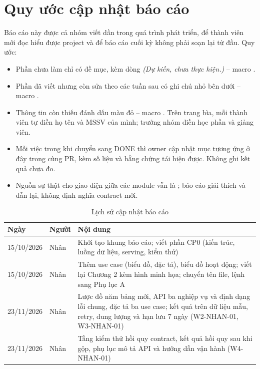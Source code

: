 \chapter*{Quy ước cập nhật báo cáo}
Báo cáo này được cả nhóm viết dần trong quá trình phát triển, để thành viên mới đọc hiểu được project và để báo cáo
cuối kỳ không phải soạn lại từ đầu. Quy ước:
\begin{itemize}
  \item Phần chưa làm chỉ có đề mục, kèm dòng \textit{(Dự kiến, chưa thực hiện.)} -- macro .
  \item Phần đã viết nhưng còn sửa theo các tuần sau có ghi chú nhỏ bên dưới -- macro
        .
  \item Thông tin còn thiếu đánh dấu màu đỏ -- macro . Trên trang bìa, mỗi thành viên tự
        điền họ tên và MSSV của mình; trưởng nhóm điền học phần và giảng viên.
  \item Mỗi việc trong  khi chuyển sang DONE thì owner cập nhật mục tương ứng ở đây trong cùng
        PR, kèm số liệu và bằng chứng tái hiện được. Không ghi kết quả chưa đo.
  \item Nguồn sự thật cho giao diện giữa các module vẫn là ; báo cáo giải thích và dẫn lại, không
        định nghĩa contract mới.
\end{itemize}

\begin{table}[H]
\centering\small
\renewcommand{\arraystretch}{1.18}
\caption{Lịch sử cập nhật báo cáo}\label{tab:lichsu}
\begin{tabularx}{\linewidth}{@{}llX@{}}
\toprule
\textbf{Ngày} & \textbf{Người} & \textbf{Nội dung} \\ \midrule
15/10/2026 & Nhân & Khởi tạo khung báo cáo; viết phần CP0 (kiến trúc, luồng dữ liệu, serving, kiểm thử) \\
15/10/2026 & Nhân & Thêm use case (biểu đồ, đặc tả), biểu đồ hoạt động; viết lại Chương 2 kèm hình minh họa; chuyển
tên file, lệnh sang Phụ lục A \\
23/11/2026 & Nhân & Lược đồ năm bảng mới, API ba nghiệp vụ và định dạng lỗi chung, đặc tả ba use case; kết quả trên dữ
liệu mẫu, retry, dung lượng và hạn lưu 7 ngày (W2-NHAN-01, W3-NHAN-01) \\
23/11/2026 & Nhân & Tầng kiểm thử hồi quy contract, kết quả hồi quy sau khi gộp, phụ lục mô tả API và hướng dẫn vận
hành (W4-NHAN-01) \\
\bottomrule
\end{tabularx}
\end{table}
